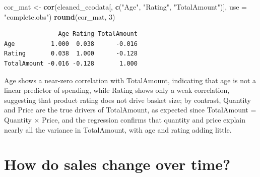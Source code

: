 \documentclass[
]{article}
\newenvironment{Shaded}{\begin{snugshade}}{\end{snugshade}}
\newcommand{\AttributeTok}[1]{\textcolor[rgb]{0.13,0.29,0.53}{#1}}
\newcommand{\DecValTok}[1]{\textcolor[rgb]{0.00,0.00,0.81}{#1}}
\newcommand{\FunctionTok}[1]{\textcolor[rgb]{0.13,0.29,0.53}{\textbf{#1}}}
\newcommand{\NormalTok}[1]{#1}
\newcommand{\OtherTok}[1]{\textcolor[rgb]{0.56,0.35,0.01}{#1}}
\newcommand{\StringTok}[1]{\textcolor[rgb]{0.31,0.60,0.02}{#1}}
\begin{document}
\begin{Shaded}
\begin{Highlighting}[]
\NormalTok{cor\_mat }\OtherTok{\textless{}{-}} \FunctionTok{cor}\NormalTok{(cleaned\_ecodata[, }\FunctionTok{c}\NormalTok{(}\StringTok{"Age"}\NormalTok{, }\StringTok{"Rating"}\NormalTok{, }\StringTok{"TotalAmount"}\NormalTok{)], }\AttributeTok{use =} \StringTok{"complete.obs"}\NormalTok{)}
\FunctionTok{round}\NormalTok{(cor\_mat, }\DecValTok{3}\NormalTok{)}
\end{Highlighting}
\end{Shaded}

\begin{verbatim}
               Age Rating TotalAmount
Age          1.000  0.038      -0.016
Rating       0.038  1.000      -0.128
TotalAmount -0.016 -0.128       1.000
\end{verbatim}

Age shows a near-zero correlation with TotalAmount, indicating that age
is not a linear predictor of spending, while Rating shows only a weak
correlation, suggesting that product rating does not drive basket size;
by contrast, Quantity and Price are the true drivers of TotalAmount, as
expected since TotalAmount = Quantity × Price, and the regression
confirms that quantity and price explain nearly all the variance in
TotalAmount, with age and rating adding little.

\section{How do sales change over
time?}\label{how-do-sales-change-over-time}
\end{document}
